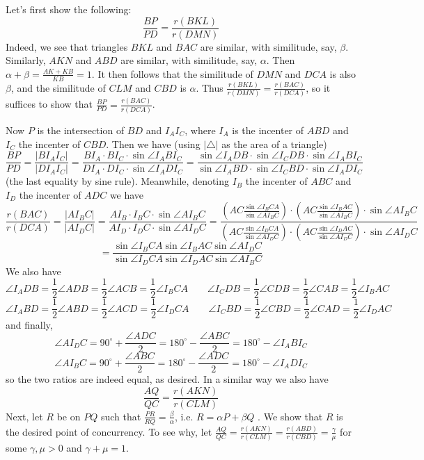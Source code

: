 \documentclass[11pt,a4paper]{article}
\begin{document}
\begin{enumerate}
	Let's first show the following: 
	\[
	\frac{BP}{PD} = \frac{r(BKL)}{r(DMN)}
	\]
	Indeed, we see that triangles $BKL$ and $BAC$ are similar, with similitude, say, $\beta$. 
	Similarly, $AKN$ and $ABD$ are similar, with similitude, say, $\alpha$. 
	Then $\alpha + \beta = \frac{AK+KB}{KB}=1$. 
	It then follows that the similitude of $DMN$ and $DCA$ is also $\beta$, 
	and the similitude of $CLM$ and $CBD$ is $\alpha$. 
	Thus $\frac{r(BKL)}{r(DMN)} = \frac{r(BAC)}{r(DCA)}$, so it suffices to show that 
	$\frac{BP}{PD} = \frac{r(BAC)}{r(DCA)}$. 
	
	Now $P$ is the intersection of $BD$ and $I_AI_C$, where $I_A$ is the incenter of $ABD$ and $I_C$
	the incenter of $CBD$. 
	Then we have (using $|\triangle|$ as the area of a triangle)
	\[
	\frac{BP}{PD}
	=\frac{|BI_AI_C|}{|DI_AI_C|}
	=\frac{BI_A\cdot BI_C\cdot \sin\angle I_ABI_C}
	{DI_A\cdot DI_C\cdot \sin\angle I_ADI_C}
	=\frac{\sin\angle I_ADB\cdot \sin\angle I_CDB\cdot \sin\angle I_ABI_C}
	{\sin\angle I_ABD\cdot \sin\angle I_CBD\cdot \sin\angle I_ADI_C}
	\]
	(the last equality by sine rule). 
	Meanwhile, denoting $I_B$ the incenter of $ABC$ and $I_D$ the incenter of $ADC$ we have 
	\[
	\frac{r(BAC)}{r(DCA)}
	=\frac{|AI_BC|}{|AI_DC|}
	=\frac{AI_B\cdot I_BC\cdot \sin\angle AI_BC}{AI_D\cdot I_DC\cdot \sin\angle AI_DC}
	=\frac{(AC\frac{\sin\angle I_BCA}{\sin\angle AI_BC})\cdot (AC\frac{\sin\angle I_BAC}{\sin\angle AI_BC})\cdot \sin\angle AI_BC}
	{(AC\frac{\sin\angle I_DCA}{\sin\angle AI_DC})\cdot (AC\frac{\sin\angle I_DAC}{\sin\angle AI_DC})\cdot \sin\angle AI_DC}
	\]
	\[
	=\frac{\sin\angle I_BCA\sin\angle I_BAC\sin\angle AI_DC}{\sin\angle I_DCA\sin\angle I_DAC\sin\angle AI_BC}
	\]
	We also have 
	\[
	\angle I_ADB
	=\frac 12\angle ADB=\frac 12\angle ACB=\frac 12\angle I_BCA
	\qquad 
	\angle I_CDB
	=\frac 12\angle CDB=\frac 12\angle CAB=\frac 12\angle I_BAC
	\]
	\[
	\angle I_ABD
	=\frac 12\angle ABD=\frac 12\angle ACD=\frac 12\angle I_DCA
	\qquad 
	\angle I_CBD
	=\frac 12\angle CBD=\frac 12\angle CAD=\frac 12\angle I_DAC
	\]
	and finally, 
	\[
	\angle AI_DC = 90^{\circ} + \frac{\angle ADC}{2}
	=180^{\circ} - \frac{\angle ABC}{2}
	=180^{\circ} - \angle I_ABI_C
	\]\[
	\angle AI_BC = 90^{\circ} + \frac{\angle ABC}{2}
	=180^{\circ} - \frac{\angle ADC}{2}
	=180^{\circ} - \angle I_ADI_C
	\]
	so the two ratios are indeed equal, as desired. 
	In a similar way we also have 
	\[
	\frac{AQ}{QC}
	=\frac{r(AKN)}{r(CLM)}
	\]
	Next, let $R$ be on $PQ$ such that $\frac{PR}{RQ} = \frac{\beta}{\alpha}$, 
	i.e. $R = \alpha P + \beta Q$ . 
	We show that $R$ is the desired point of concurrency. 
	To see why, let $\frac{AQ}{QC}=\frac{r(AKN)}{r(CLM)}=\frac{r(ABD)}{r(CBD)}=\frac{\gamma}{\mu}$ for some $\gamma, \mu>0$ and $\gamma + \mu = 1$. 

\end{enumerate}
\end{document}
